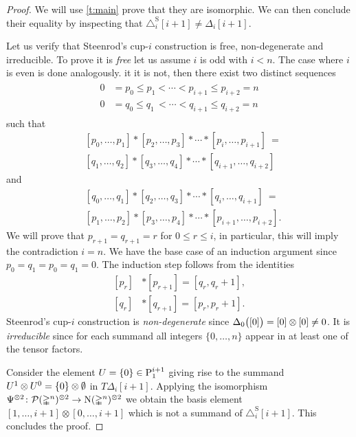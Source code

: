 \begin{proof}
	We will use \cref{t:main} prove that they are isomorphic.
	We can then conclude their equality by inspecting that $\triangle^{\mathrm{S}}_i [i+1] \neq \Delta_i [i+1]$.

	Let us verify that Steenrod's \mbox{cup-$i$} construction is free, non-degenerate and irreducible.
	To prove it is \emph{free} let us assume $i$ is odd with $i < n$.
	The case where $i$ is even is done analogously.
	it it is not, then there exist two distinct sequences
	\begin{align*}
	\begin{split}
	0 &= p_0 \leq p_1 < \cdots < p_{i+1} \leq p_{i+2} = n \\
	0 &= q_0 \leq q_1 \,< \cdots < q_{i+1} \leq q_{i+2} = n
	\end{split}
	\end{align*}
	such that
	\[
	\begin{split}
	&[ {p_0}, \dots, {p_1} ] \ast [ {p_2}, \dots, {p_3} ] \ast \cdots \ast [ {p_{i}}, \dots, {p_{i+1}} ]\ = \\
	&[ {q_1}, \dots, {q_2} ] \ast [ {q_3}, \dots, {q_4} ] \ast \cdots \ast [ {q_{i+1}}, \dots, {q_{i+2}} ]
	\end{split}
	\]
	and
	\[
	\begin{split}
	&[ {q_0}, \dots, {q_1} ] \ast [ {q_2}, \dots, {q_3} ] \ast \cdots \ast [ {q_{i}}, \dots, {q_{i+1}} ]\ = \\
	&[ {p_1}, \dots, {p_2} ] \ast [ {p_3}, \dots, {p_4} ] \ast \cdots \ast [ {p_{i+1}}, \dots, {p_{i+2}} ].
	\end{split}
	\]
	We will prove that $p_{r+1} = q_{r+1} = r$ for $0 \leq r \leq i$, in particular, this will imply the contradiction $i = n$.
	We have the base case of an induction argument since $p_0 = q_1 = p_0 = q_1 = 0$.
	The induction step follows from the identities
	\[
	\begin{split}
	[p_r] &\ast [p_{r+1}] = [q_r, q_{r}+1], \\
	[q_r] &\ast [q_{r+1}] = [p_r, p_{r}+1].
	\end{split}
	\]
	Steenrod's \mbox{cup-$i$} construction is \emph{non-degenerate} since $\Delta_0\big([0]\big) = [0] \otimes [0] \neq 0$.
	It is \emph{irreducible} since for each summand all integers $\{0, \dots, n\}$ appear in at least one of the tensor factors.

	Consider the element $U = \{0\} \in \mathrm{P}_{1}^{i+1}$ giving rise to the summand $U^1 \otimes U^0 = \{0\} \otimes \emptyset$ in $T \Delta_i [i+1]$.
	Applying the isomorphism $\Psi^{\otimes 2} \colon \mathcal{P}(\mathbb{\Delta}^n)^{\otimes 2} \to \operatorname{N}(\mathbb{\Delta}^n)^{\otimes 2}$ we obtain the basis element $[1,\dots,i+1] \otimes [0,\dots,i+1]$ which is not a summand of $\triangle^{\mathrm{S}}_i [i+1]$.
	This concludes the proof.
\end{proof}

